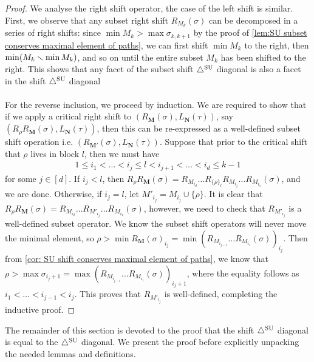 \begin{proof}
We analyse the right shift operator, the case of the left shift is similar. 
First, we observe that any subset right shift $R_{M_k}(\sigma)$ can be decomposed in a series of right shifts: since $\min M_k > \max \sigma_{k,k+1}$ by the proof of \cref{lem:SU subset conserves maximal element of paths}, we can first shift $\min M_k$ to the right, then $\min (M_k \smallsetminus \min M_k)$, and so on until the entire subset $M_k$ has been shifted to the right. 
This shows that any facet of the subset shift $\triangle^{\mathrm{SU}}$ diagonal is also a facet in the shift $\triangle^{\mathrm{SU}}$ diagonal
\\\\
For the reverse inclusion, we proceed by induction. We are required to show that if we apply a critical right shift to $(R_{\mathbf{M}}(\sigma),L_{\mathbf{N}}(\tau))$, say $(R_{\rho}R_{\mathbf{M}}(\sigma),L_{\mathbf{N}}(\tau))$, then this can be re-expressed as a well-defined subset shift operation i.e. $(R_{\mathbf{M'}}(\sigma),L_{\mathbf{N}}(\tau))$. Suppose that prior to the critical shift that $\rho$ lives in block $l$, then we must have
\begin{align*}
    1 \leq i_1 < \dots < i_j \leq l < i_{j+1} <\dots< i_d \leq k-1
\end{align*}
for some $j\in [d]$. If $i_j < l$, then $R_{\rho}R_{\mathbf{M}}(\sigma) = R_{M_{i_d}}\dots R_{\{\rho\}_{l}}R_{M_{i_j}}\dots R_{M_{i_1}}(\sigma)$, and we are done.
Otherwise, if $i_j = l$, let $M'_{i_j} = M_{i_j} \cup \{\rho \}$. It is clear that $R_{\rho}R_{\mathbf{M}}(\sigma) = R_{M_{i_d}}\dots R_{M'_{i_j}}\dots R_{M_{i_1}}(\sigma)$, however, we need to check that $R_{M'_{i_j}}$ is a well-defined subset operator. 
We know the subset shift operators will never move the minimal element, so $\rho > \min R_{\mathbf{M}}(\sigma)_{i_j}= \min (R_{M_{i_{j-1}}}\dots R_{M_{i_1}}(\sigma))_{i_j}$.
Then from \cref{cor: SU shift conserves maximal element of paths}, we know that $\rho>\max \sigma_{i_j+1} = \max (R_{M_{i_{j-1}}}\dots R_{M_{i_1}}(\sigma))_{i_j + 1}$, where the equality follows as $i_1<\dots<i_{j-1}<i_j$. This proves that $R_{M'_{i_j}}$ is well-defined, completing the inductive proof.
\end{proof}

The remainder of this section is devoted to the proof that the shift $\triangle^{\mathrm{SU}}$ diagonal is equal to the $\triangle^{\mathrm{SU}}$ diagonal. 
We present the proof before explicitly unpacking the needed lemmas and definitions.

